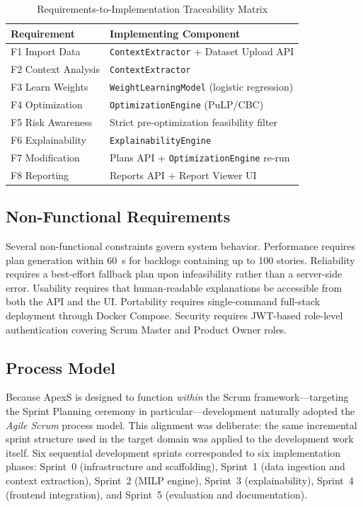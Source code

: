 \documentclass[conference]{IEEEtran}
\begin{document}
\begin{table}[t]
	\caption{Requirements-to-Implementation Traceability Matrix}
	\label{tab:req-traceability}
	\centering\small
	\begin{tabularx}{\columnwidth}{lY}
		\toprule
		Requirement         & Implementing Component                             \\
		\midrule
		F1 Import Data      & \texttt{ContextExtractor} + Dataset Upload API     \\
		F2 Context Analysis & \texttt{ContextExtractor}                          \\
		F3 Learn Weights    & \texttt{WeightLearningModel} (logistic regression) \\
		F4 Optimization     & \texttt{OptimizationEngine} (PuLP/CBC)             \\
		F5 Risk Awareness   & Strict pre-optimization feasibility filter         \\
		F6 Explainability   & \texttt{ExplainabilityEngine}                      \\
		F7 Modification     & Plans API + \texttt{OptimizationEngine} re-run     \\
		F8 Reporting        & Reports API + Report Viewer UI                     \\
		\bottomrule
	\end{tabularx}
\end{table}

\subsection{Non-Functional Requirements}

Several non-functional constraints govern system behavior.
Performance requires plan generation within 60~s for backlogs containing up to 100
stories.
Reliability requires a best-effort fallback plan upon infeasibility rather than a
server-side error.
Usability requires that human-readable explanations be accessible from both the API
and the UI.
Portability requires single-command full-stack deployment through Docker Compose.
Security requires JWT-based role-level authentication covering Scrum Master and
Product Owner roles.

\subsection{Process Model}

Because ApexS is designed to function \emph{within} the Scrum framework---targeting
the Sprint Planning ceremony in particular---development naturally adopted the
\emph{Agile Scrum} process model.
This alignment was deliberate: the same incremental sprint structure used in the
target domain was applied to the development work itself.
Six sequential development sprints corresponded to six implementation phases: Sprint~0
(infrastructure and scaffolding), Sprint~1 (data ingestion and context extraction),
Sprint~2 (MILP engine), Sprint~3 (explainability), Sprint~4 (frontend integration),
and Sprint~5 (evaluation and documentation).
\end{document}
